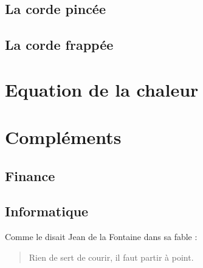 \documentclass[a4paper,12pt]{report}
\begin{document}
\section{La corde pincée}
\section{La corde frappée}

\chapter{Equation de la chaleur}

\chapter{Compléments}
\section{Finance}
\section{Informatique}

Comme le disait Jean de la Fontaine dans sa fable :
\begin{quote}
Rien de sert de courir, il faut partir à point.
\end{quote}
\end{document}
